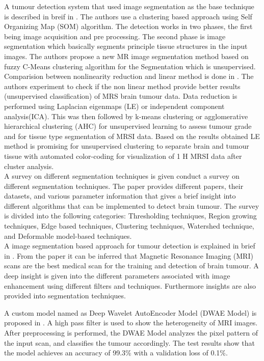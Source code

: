 A tumour detection system that used image segmentation as the base technique is described in breif in \cite{ref5}. The authors use a clustering based approach using Self Organizing Map (SOM) algorithm. The detection works in two phases, the first being image acquisition and pre processing. The second phase is image segmentation which basically segments principle tissue structures in the input images. The authors propose a new MR image segmentation method based on fuzzy C-Means clustering algorithm for the Segmentation which is unsupervised. \\

Comparision between nonlinearity reduction and linear method is done in \cite{ref6}. The authors experiment to check if the non linear method provide better results (unsupervised classification) of MRS brain tumour data. Data reduction is performed using Laplacian eigenmaps (LE) or independent component analysis(ICA). This was then followed by k-means clustering or agglomerative hierarchical clustering (AHC) for unsupervised learning to assess tumour grade and for tissue type segmentation of MRSI data. Based on the results obtained LE method is promising for unsupervised clustering to separate brain and tumour tissue with automated color-coding for visualization of 1 H MRSI data after cluster analysis.\\

A survey on different segmentation techniques is given \cite{ref7} conduct a survey on different segmentation techniques. The paper provides different papers, their datasets, and various parameter information that gives a brief insight into different algorithms that can be implemented to detect brain tumour. The survey is divided into the following categories: Thresholding techniques, Region growing techniques, Edge based techniques, Clustering techniques, Watershed technique, and Deformable model-based techniques.\\

A image segmentation based approach for tumour detection is explained in brief in \cite{ref8}. From the paper it can be inferred that Magnetic Resonance Imaging (MRI) scans are the best medical scan for the training and detection of brain tumour. A deep insight is given into the different parameters associated with image enhancement using different filters and techniques. Furthermore insights are also provided into segmentation techniques.

A custom model named as Deep Wavelet AutoEncoder Model (DWAE Model) is proposed in \cite{ref9}. A high pass filter is used to show the heterogeneity of MRI images. After preprocessing is performed,  the DWAE Model analyzes the pixel pattern of the input scan, and classifies the tumour accordingly. The test results show that the model achieves an accuracy of 99.3\% with a validation loss of 0.1\%.